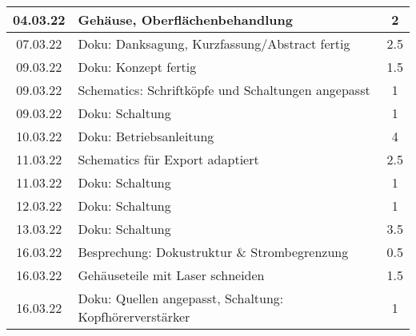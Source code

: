\begin{longtable}{c|p{10cm}|c}
    04.03.22       & Gehäuse, Oberflächenbehandlung                                                                         & 2                     \\ \hline
    07.03.22       & Doku: Danksagung, Kurzfassung/Abstract fertig                                                          & 2.5                   \\ \hline
    09.03.22       & Doku: Konzept fertig                                                                                   & 1.5                   \\ \hline
    09.03.22       & Schematics: Schriftköpfe und Schaltungen angepasst                                                     & 1                     \\ \hline
    09.03.22       & Doku: Schaltung                                                                                        & 1                     \\ \hline
    10.03.22       & Doku: Betriebsanleitung                                                                                & 4                     \\ \hline
    11.03.22       & Schematics für Export adaptiert                                                                        & 2.5                   \\ \hline
    11.03.22       & Doku: Schaltung                                                                                        & 1                     \\ \hline
    12.03.22       & Doku: Schaltung                                                                                        & 1                     \\ \hline
    13.03.22       & Doku: Schaltung                                                                                        & 3.5                   \\ \hline
    16.03.22       & Besprechung: Dokustruktur \& Strombegrenzung                                                           & 0.5                   \\ \hline
    16.03.22       & Gehäuseteile mit Laser schneiden                                                                       & 1.5                   \\ \hline
    16.03.22       & Doku: Quellen angepasst, \newline Schaltung: Kopfhörerverstärker                                                & 1                     \\ \hline

\end{longtable}
